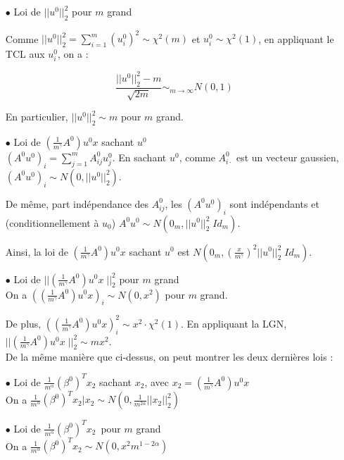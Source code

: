 \documentclass[a4paper, 11pt, french]{article}
\theoremstyle{definition}
\begin{document}
\begin{itemize}
	\item[$\bullet$] Loi de $ || u^0 ||_2^2$ pour $m$ grand
	
	Comme $ || u^0 ||_2^2 = \sum_{i=1}^{m} (u_i^0)^2 \sim \chi^2 (m)$ et $ u_i^0 \sim \chi^2 (1)$, en appliquant le TCL aux $ u_i^0 $, on a :
	
	\[
	\frac{|| u^0 ||_2^2 - m}{\sqrt{2m}} \sim_{m \to \infty}  N(0, 1)
	\]
	
	En particulier, $ || u^0 ||_2^2 \sim  m$  pour $m$ grand. \\
	
	\item[$\bullet$] Loi de $ \left(\frac{1}{m^{\gamma}} A^0 \right) u^0 x $ sachant $ u^0 $ \\
	
	$ (A^0 u^0)_i = \sum_{j=1}^m A_{ij}^0 u_j^0$. En sachant $u^0$, comme 
	$A_{i \cdot}^0$ est un vecteur gaussien, $(A^0 u^0)_i \sim  N(0, || u^0 ||_2^2 ) $. 
	
	De même, part indépendance des $A_{ij}^0$, les $(A^0 u^0)_i$ sont indépendants et (conditionnellement à $u_0$) $A^0 u^0 \sim N(0_m, || u^0 ||_2^2 \; Id_m)$.
	
	Ainsi, la loi de $ \left(\frac{1}{m^{\gamma}} A^0 \right) u^0 x $ sachant $ u^0$ est $N(0_m, \left( \frac{x}{m^{\gamma}} \right)^2 || u^0 ||_2^2 \; Id_m) $. \\


	\item[$\bullet$] Loi de $ || \left(\frac{1}{m^{\gamma}} A^0 \right) u^0 x \; ||_2^2 $ pour $m$ grand
	\\
	
	On a $ \left( \left(\frac{1}{m^{\gamma}} A^0 \right) u^0 x \right)_i \sim  N(0,x^2)$ pour $m$ grand.
	
	De plus, $ \left( \left(\frac{1}{m^{\gamma}} A^0 \right) u^0 x \right)_i^2 \sim  
	x^2 \cdot  \chi^2 (1) $. En appliquant la LGN, $||\left(\frac{1}{m^{\gamma}} A^0 \right) u^0 x \; ||_2^2 \sim m x^2$. \\
	
	
	De la même manière que ci-dessus, on peut montrer les deux dernières lois : \\
	
	
	\item[$\bullet$] Loi de $ \frac{1}{m^{\alpha}} (\beta^0)^T x_2 $ sachant $x_2$, avec 
	$x_2 = \left(\frac{1}{m^{\gamma}} A^0 \right) u^0 x$ \\
	
	On a 
	$ \frac{1}{m^{\alpha}} (\beta^0)^T x_2 | x_2 \sim N(0,  \frac{1}{m^{2\alpha}}||x_2||_2^2) $
	\\
	
	\item[$\bullet$] Loi de $ \frac{1}{m^{\alpha}} (\beta^0)^T x_2 $ pour $m$ grand\\
	
	On a $ \frac{1}{m^{\alpha}} (\beta^0)^T x_2 \sim N(0,  x^2 m^{1 - 2\alpha}) $
	\\
\end{itemize}
\end{document}
